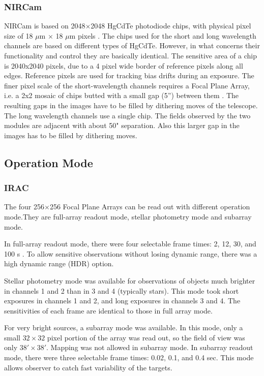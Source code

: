 \documentclass[preprint, 12pt]{aastex}
\begin{document}
\subsubsection{NIRCam}

NIRCam is based on 2048$\times$2048 HgCdTe photodiode chips, with
physical pixel size of 18 $\mu$m $\times$ 18 $\mu$m pixels
\citep{2005SPIE.5904...21B}. The chips used for the short and long
wavelength channels are based on different types of HgCdTe. However,
in what concerns their functionality and control they are basically
identical.  The sensitive area of a chip is 2040x2040 pixels, due to a
4 pixel wide border of reference pixels along all edges. Reference
pixels are used for tracking bias drifts during an exposure.  The
finer pixel scale of the short-wavelength channels requires a Focal
Plane Array, i.e. a 2x2 mosaic of chips butted with a small gap (5”)
between them \citep{2005SPIE.5904...21B}. The resulting gaps in the
images have to be filled by dithering moves of the telescope. The long
wavelength channels use a single chip.  The fields observed by the two
modules are adjacent with about 50" separation. Also this larger gap
in the images has to be filled by dithering moves.


\subsection{Operation Mode}
\subsubsection{IRAC}

The four 256$\times$256 Focal Plane Arrays can be read out with different
operation mode.They are full-array readout mode, stellar photometry
mode and subarray mode.\par

In full-array readout mode, there were four selectable frame times: 2,
12, 30, and 100 s \citep{2004ApJS..154...10F}. To allow sensitive observations without losing dynamic
range, there was a high dynamic range (HDR) option. 

Stellar photometry mode was available for observations of objects much
brighter in channels 1 and 2 than in 3 and 4 (typically stars). This
mode took short exposures in channels 1 and 2, and long exposures in
channels 3 and 4.  The sensitivities of each frame are identical to
those in full array mode.

For very bright sources, a subarray mode was available. In this mode,
only a small $32 \times 32$ pixel portion of the array was read out,
so the field of view was only $38' \times 38'$. Mapping was not
allowed in subarray mode.  In subarray readout mode, there were three
selectable frame times: 0.02, 0.1, and 0.4 sec. This mode allows
observer to catch fast variability of the targets.
\end{document}
